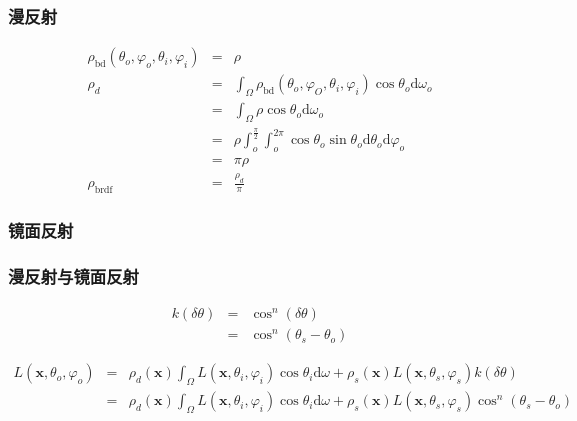 \documentclass{beamer}
\newcommand{\mathd}{\mathrm{d}}
\newcommand{\tmmathbf}[1]{\ensuremath{\boldsymbol{#1}}}
\newcommand{\tmop}[1]{\ensuremath{\operatorname{#1}}}
\begin{document}
{{\begin{frame}
\end{frame}

\begin{frame}
  \frametitle{漫反射}
  
  
  \begin{eqnarray*}
    \rho_{\tmop{bd}} (\theta_o, \varphi_o, \theta_i, \varphi_i) & = & \rho\\
    \rho_d & = & \int_{\Omega} \rho_{\tmop{bd}} (\theta_o, \varphi_O,
    \theta_i, \varphi_i) \cos \theta_o \mathd \omega_o\\
    & = & \int_{\Omega} \rho \cos \theta_o \mathd \omega_o\\
    & = & \rho \int_o^{\frac{\pi}{2}} \int_o^{2 \pi} \cos \theta_o \sin
    \theta_o \mathd \theta_o \mathd \varphi_o\\
    & = & \pi \rho\\
    \rho_{\tmop{brdf}} & = & \frac{\rho_d}{\pi}
  \end{eqnarray*}
\end{frame}

\begin{frame}
  \frametitle{镜面反射}
  
\end{frame}

\begin{frame}
  \frametitle{漫反射与镜面反射}
  
  
  \begin{eqnarray*}
    k (\delta \theta) & = & \cos^n (\delta \theta)\\
    & = & \cos^n (\theta_s - \theta_o)
  \end{eqnarray*}
  
  \begin{eqnarray*}
    L (\tmmathbf{x}, \theta_o, \varphi_o) & = & \rho_d (\tmmathbf{x})
    \int_{\Omega} L (\tmmathbf{x}, \theta_i, \varphi_i) \cos \theta_i \mathd
    \omega + \rho_s (\tmmathbf{x}) L (\tmmathbf{x}, \theta_s, \varphi_s) k
    (\delta \theta)\\
    & = & \rho_d (\tmmathbf{x}) \int_{\Omega} L (\tmmathbf{x}, \theta_i,
    \varphi_i) \cos \theta_i \mathd \omega + \rho_s (\tmmathbf{x}) L
    (\tmmathbf{x}, \theta_s, \varphi_s) \cos^n (\theta_s - \theta_o)
  \end{eqnarray*}
\end{frame}}}
\end{document}
